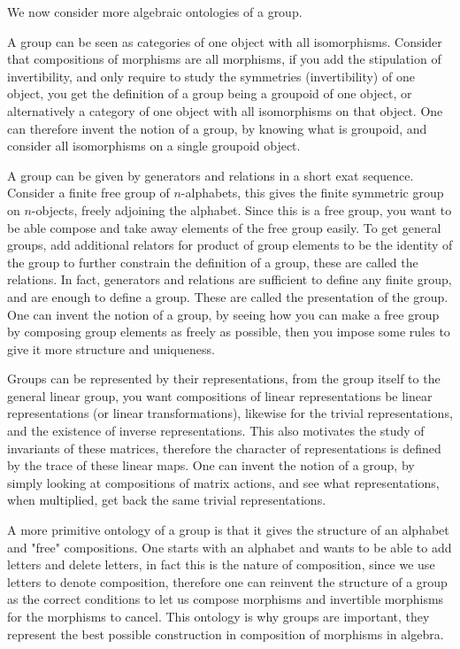 \documentclass{tufte-book}
\begin{document}
We now consider more algebraic ontologies of a group.

A group can be seen as categories of one object with all isomorphisms. Consider that compositions of morphisms are all morphisms, if you add the stipulation of invertibility, and only require to study the symmetries (invertibility) of one object, you get the definition of a group being a groupoid of one object, or alternatively a category of one object with all isomorphisms on that object. One can therefore invent the notion of a group, by knowing what is groupoid, and consider all isomorphisms on a single groupoid object.

A group can be given by generators and relations in a short exat sequence. Consider a finite free group of $n$-alphabets, this gives the finite symmetric group on $n$-objects, freely adjoining the alphabet. Since this is a free group, you want to be able compose and take away elements of the free group easily. To get general groups, add additional relators for product of group elements to be the identity of the group to further constrain the definition of a group, these are called the relations. In fact, generators and relations are sufficient to define any finite group, and are enough to define a group. These are called the presentation of the group. One can invent the notion of a group, by seeing how you can make a free group by composing group elements as freely as possible, then you impose some rules to give it more structure and uniqueness.

Groups can be represented by their representations, from the group itself to the general linear group, you want compositions of linear representations be linear representations (or linear transformations), likewise for the trivial representations, and the existence of inverse representations. This also motivates the study of invariants of these matrices, therefore the character of representations is defined by the trace of these linear maps. One can invent the notion of a group, by simply looking at compositions of matrix actions, and see what representations, when multiplied, get back the same trivial representations.

A more primitive ontology of a group is that it gives the structure of an alphabet and "free" compositions. One starts with an alphabet and wants to be able to add letters and delete letters, in fact this is the nature of composition, since we use letters to denote composition, therefore one can reinvent the structure of a group as the correct conditions to let us compose morphisms and invertible morphisms for the morphisms to cancel. This ontology is why groups are important, they represent the best possible construction in composition of morphisms in algebra.
\end{document}
